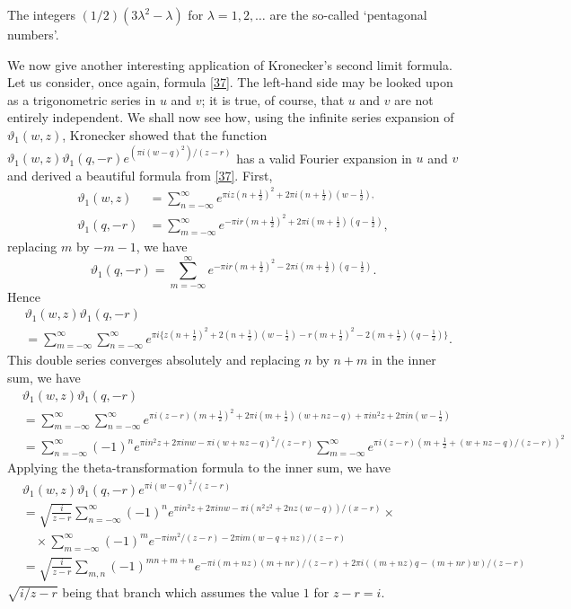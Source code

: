 The integers $(1/2)(3\lambda^{2}-\lambda)$ for $\lambda=1,2,\ldots$
are the so-called `pentagonal numbers'.

We now give another interesting application of Kronecker's second
limit formula. Let us consider, once again, formula \eqref{37}. The
left-hand side may be looked upon as a trigonometric series in $u$ and
$v$; it is true, of course, that $u$ and $v$ are not entirely
independent. We shall now see how, using the infinite series expansion
of $\vartheta_{1}(w,z)$, Kronecker showed that the function
$\vartheta_{1}(w,z)\vartheta_{1}(q,-r)e^{(\pi i(w-q)^{2})/(z-r)}$ has
a valid Fourier expansion in $u$ and $v$ and derived a beautiful
formula from \eqref{37}. First,
\begin{align*}
\vartheta_{1}(w,z) &= \sum^{\infty}_{n=-\infty}e^{\pi
  iz(n+\frac{1}{2})^{2}+2\pi i(n+\frac{1}{2})(w-\frac{1}{2}),}\\
\vartheta_{1}(q,-r) &= \sum^{\infty}_{m=-\infty}e^{-\pi
  ir(m+\frac{1}{2})^{2}+2\pi i(m+\frac{1}{2})(q-\frac{1}{2})},
\end{align*}
replacing $m$ by $-m-1$, we have
$$
\vartheta_{1}(q,-r)=\sum^{\infty}_{m=-\infty}e^{-\pi
  ir(m+\frac{1}{2})^{2}-2\pi i(m+\frac{1}{2})(q-\frac{1}{2})}.
$$
Hence
\begin{align*}
& \vartheta_{1}(w,z)\vartheta_{1}(q,-r)\\
&=\sum^{\infty}_{m=-\infty}\sum^{\infty}_{n=-\infty}e^{\pi i\{z(n+\frac{1}{2})^{2}+2(n+\frac{1}{2})(w-\frac{1}{2})-r(m+\frac{1}{2})^{2}-2(m+\frac{1}{2})(q-\frac{1}{2})\}}.
\end{align*}
This double series converges absolutely and replacing $n$ by $n+m$ in
the inner sum, we have 
\begin{align*}
& \vartheta_{1}(w,z)\vartheta_{1}(q,-r)\\
&= \sum^{\infty}_{m=-\infty}\sum^{\infty}_{n=-\infty}e^{\pi
    i(z-r)(m+\frac{1}{2})^{2}+2\pi i(m+\frac{1}{2})(w+nz-q)+\pi i
    n^{2}z+2\pi in(w-\frac{1}{2})}\\
&= \sum^{\infty}_{n=-\infty}(-1)^{n}e^{\pi in^{2}z+2\pi inw-\pi
    i(w+nz-q)^{2}/(z-r)}\sum^{\infty}_{m=-\infty}e^{\pi
    i(z-r)(m+\frac{1}{2}+(w+nz-q)/(z-r))^{2}}
\end{align*}\pageoriginale
Applying the theta-transformation formula to the inner sum, we have
\begin{align*}
& \vartheta_{1}(w,z)\vartheta_{1}(q,-r)e^{\pi i(w-q)^{2}/(z-r)}\\
&= \sqrt{\frac{i}{z-r}}\sum^{\infty}_{n=-\infty}(-1)^{n}e^{\pi
    in^{2}z+2\pi inw-\pi i(n^{2}z^{2}+2nz(w-q))/(x-r)}\times\\
&\quad \times \sum^{\infty}_{m=-\infty}(-1)^{m}e^{-\pi
    im^{2}/(z-r)-2\pi im(w-q+nz)/(z-r)}\\
&=\sqrt{\frac{i}{z-r}}\sum_{m,n}(-1)^{mn+m+n} {e}^{-\pi
    i(m+nz)(m+nr)/(z-r)+2\pi i((m+nz)q-(m+nr)w)/(z-r)} 
\end{align*}
$\sqrt{i/z-r}$ being that branch which assumes the value $1$ for
$z-r=i$.

